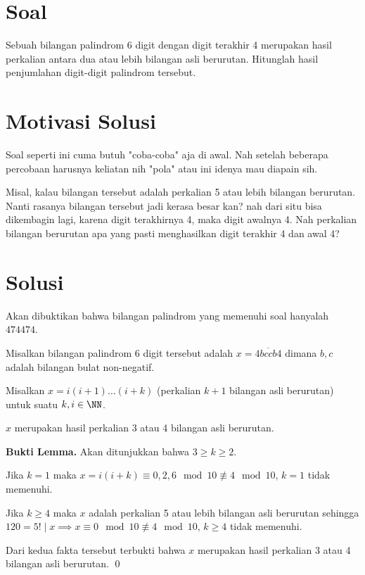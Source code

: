 
\section{Soal}
Sebuah bilangan palindrom 6 digit dengan digit terakhir 4 merupakan hasil perkalian antara dua atau lebih bilangan asli berurutan. Hitunglah hasil penjumlahan digit-digit palindrom tersebut.

\newpage
\section{Motivasi Solusi}
\begin{motivasi*}
    Soal seperti ini cuma butuh "coba-coba" aja di awal. Nah setelah beberapa percobaan harusnya keliatan nih "pola" atau ini idenya mau diapain sih. 
    
    Misal, kalau bilangan tersebut adalah perkalian 5 atau lebih bilangan berurutan. Nanti rasanya bilangan tersebut jadi kerasa besar kan? nah dari situ bisa dikembagin lagi, karena digit terakhirnya 4, maka digit awalnya 4. Nah perkalian bilangan berurutan apa yang pasti menghasilkan digit terakhir 4 dan awal 4?
\end{motivasi*}
\section{Solusi}
    Akan dibuktikan bahwa bilangan palindrom yang memenuhi soal hanyalah $474474$.
    
    Misalkan bilangan palindrom 6 digit tersebut adalah $x=\overline{4bccb4}$ dimana $b,c$ adalah bilangan bulat non-negatif. 
    
    Misalkan $x = i(i+1)\dots(i+k)$ (perkalian $k+1$ bilangan asli berurutan) untuk suatu $k,i \in \NN$. 
    
    \begin{lemma}
        $x$ merupakan hasil perkalian 3 atau 4 bilangan asli berurutan.
        
        \textbf{Bukti Lemma.}   Akan ditunjukkan bahwa $3 \ge k \ge 2$. 
        
        Jika $k = 1$ maka $x = i(i+k) \equiv 0, 2, 6 \mod 10 \not \equiv 4 \mod 10$, $k=1$ tidak memenuhi.
        
        Jika $k \ge 4$ maka $x$ adalah perkalian 5 atau lebih bilangan asli berurutan sehingga $120 = 5! \mid x \implies x \equiv 0 \mod 10 \not \equiv 4 \mod 10$, $k \ge 4$ tidak memenuhi. 
        
        Dari kedua fakta tersebut terbukti bahwa $x$ merupakan hasil perkalian 3 atau 4 bilangan asli berurutan. \qed
    \end{lemma}
    
